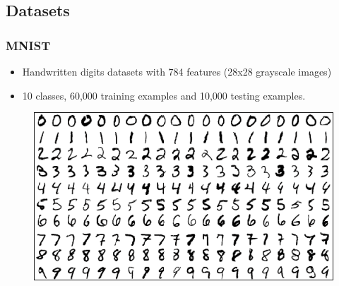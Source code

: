 \documentclass{beamer}
\begin{document}
\subsection{Datasets}
\begin{frame}\frametitle{MNIST}
\begin{itemize}
	\item Handwritten digits datasets
	with 784 features (28x28 grayscale images)
	\item 10 classes, 60,000 training examples and
	10,000 testing examples.
\end{itemize}
\begin{figure}[h]
	\includegraphics[scale=0.3]{figures/mnist}
	\centering
	\label{fig:mnist}
\end{figure}
\end{frame}
\end{document}
